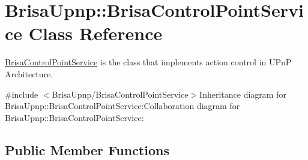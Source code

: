 \hypertarget{classBrisaUpnp_1_1BrisaControlPointService}{
\section{BrisaUpnp::BrisaControlPointService Class Reference}
\label{classBrisaUpnp_1_1BrisaControlPointService}
}


\hyperlink{classBrisaUpnp_1_1BrisaControlPointService}{BrisaControlPointService} is the class that implements action control in UPnP Architecture.  


{\ttfamily \#include $<$BrisaUpnp/BrisaControlPointService$>$}Inheritance diagram for BrisaUpnp::BrisaControlPointService:Collaboration diagram for BrisaUpnp::BrisaControlPointService:\subsection*{Public Member Functions}
